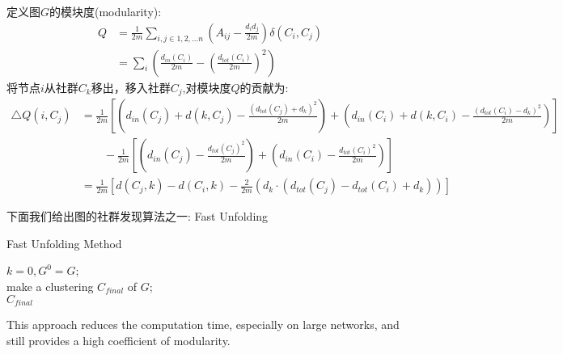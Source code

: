 \documentclass[UTF8, onecolumn, a4paper]{article}
\begin{document}
	定义图$G$的模块度(modularity):
	\begin{equation}
	\begin{aligned}
	Q &= \frac{1}{2m}\underset{i,j\in 1,2,...n}{\sum}\left(A_{ij} - \frac{d_i d_j}{2m}\right)\delta(C_i, C_j)\\
	&=\underset{i}{\sum}\left(\frac{d_{in}(C_i)}{2m} - \left(\frac{d_{tot}(C_i)}{2m}\right)^2\right)
	\end{aligned}
	\end{equation}
	将节点$i$从社群$C_k$移出，移入社群$C_j$,对模块度$Q$的贡献为:
	\begin{equation}
	\begin{aligned}
	\triangle Q(i, C_j) &= \frac{1}{2m} \left[ \left(d_{in}(C_j) + d(k, C_j) - \frac{(d_{tot}(C_j)+d_k)^2}{2m}\right)+
	\left( d_{in}(C_i) + d(k, C_i) - \frac{(d_{tot}(C_i)-d_k)^2}{2m} \right)\right]\\ 
	&\qquad - \frac{1}{2m} \left[ \left(d_{in}(C_j) - \frac{d_{tot}(C_j)^2}{2m}\right) + 
	\left( d_{in}(C_i) - \frac{ d_{tot} (C_i)^2 }{ 2m } \right) \right] \\
	&= \frac{1}{2m}\left[d(C_j, k) - d(C_i, k) - \frac{2}{2m}\left(d_k \cdot(d_{tot}(C_j) - d_{tot}(C_i) + d_k)\right)\right]
	\end{aligned}
	\end{equation}
	
	下面我们给出图的社群发现算法之一: Fast Unfolding\\
	\begin{algorithm}[H]
		\caption{Fast Unfolding Method}%
		$k = 0, G^0 = G$;\\ %
		make a clustering $C_{final}$ of $G$;\\
		\Return $C_{final}$
	\end{algorithm}
	This approach reduces the computation time, especially on large networks, and still provides a high coefficient of modularity.\\
	
\end{document}
